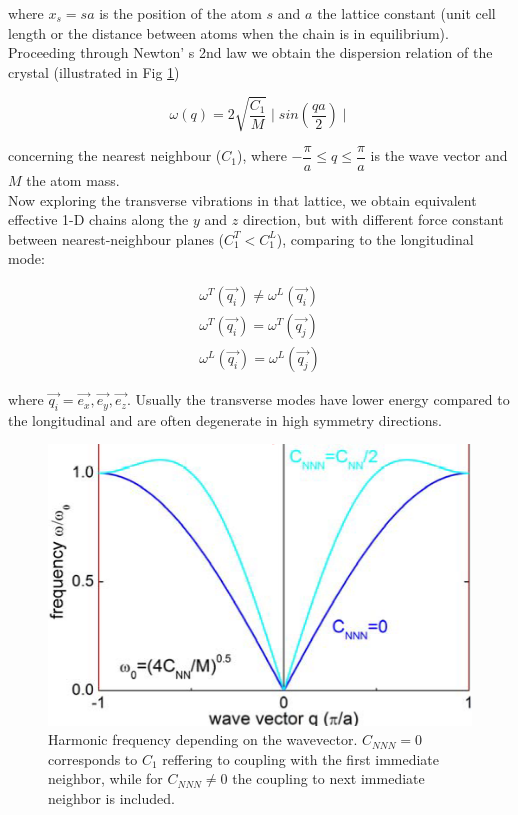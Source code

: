 \documentclass[openany,11pt,a4paper]{report}
\begin{document}
where $x_{s}= s a$ is the position of the atom $s$ and $a$ the lattice constant (unit cell length  or the distance between atoms when the chain is in equilibrium). Proceeding through Newton' s 2nd law we obtain the dispersion relation of the crystal (illustrated in Fig \ref{1Ddispersion})
 
\begin{equation}
\omega (q)=2 \sqrt{\dfrac{C_{1}}{M}}  \mid sin (\dfrac{q a}{2}) \mid
\end{equation}
 
concerning the nearest neighbour ($C_{1}$),  where $- \dfrac{\pi}{a} \leq q  \leq \dfrac{\pi}{a} $ is the wave vector and $M$ the atom mass. \cite{phonons}\\
 
 
Now exploring the transverse vibrations in that lattice, we obtain equivalent effective 1-D chains along the $y$ and $z$ direction, but with different force constant between nearest-neighbour planes ($ C^{T}_{1} <   C^{L}_{1}  $), comparing to the longitudinal mode:
 
 
\begin{equation}
\begin{aligned}
\omega^{T} (\vec{q_{i}}) \neq  \omega ^{L} (\vec{q_{i}})  \\
 \omega^{T} (\vec{q_{i}}) =  \omega ^{T} (\vec{q_{j}}) \\
  \omega^{L} (\vec{q_{i}}) =  \omega ^{L} (\vec{q_{j}})
 \end{aligned}
\end{equation} 

where $\vec{q_{i}}= \vec{e_{x}},\vec{e_{y}},\vec{e_{z}}$. Usually the transverse modes have lower energy compared to the longitudinal and are often degenerate in high
symmetry directions.



\begin{figure}[H]
\centering
\includegraphics[scale=0.7]{phonon.PNG}
\caption{Harmonic frequency depending on the wavevector. $C_{NNN}=0$ corresponds to $C_{1}$ reffering to coupling with the first immediate neighbor, while for $C_{NNN}\neq 0$ the coupling to next immediate neighbor is included. \cite{CM1}}
\label{1Ddispersion}
\end{figure}
\end{document}

